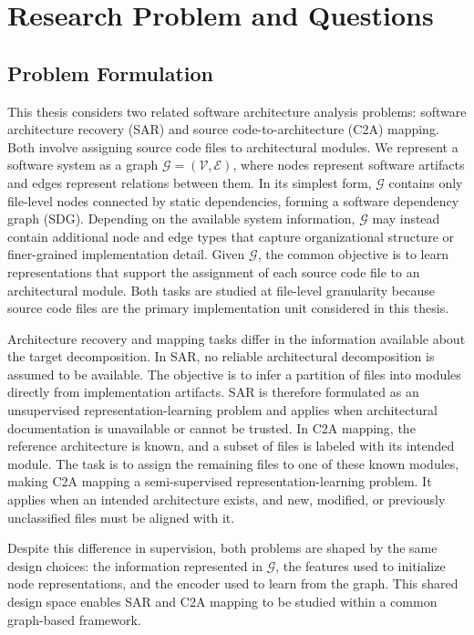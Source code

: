 \chapter{Research Problem and Questions}
\chaptertoc

\section{Problem Formulation}
\label{sec:problem_formulation}
This thesis considers two related software architecture analysis problems: software architecture recovery (SAR) and source code-to-architecture (C2A) mapping. Both involve assigning source code files to architectural modules. We represent a software system as a graph $\mathcal{G} = (\mathcal{V}, \mathcal{E})$, where nodes represent software artifacts and edges represent relations between them. In its simplest form, $\mathcal{G}$ contains only file-level nodes connected by static dependencies, forming a software dependency graph (SDG). Depending on the available system information, $\mathcal{G}$ may instead contain additional node and edge types that capture organizational structure or finer-grained implementation detail. Given $\mathcal{G}$, the common objective is to learn representations that support the assignment of each source code file to an architectural module. Both tasks are studied at file-level granularity because source code files are the primary implementation unit considered in this thesis.

Architecture recovery and mapping tasks differ in the information available about the target decomposition. In SAR, no reliable architectural decomposition is assumed to be available. The objective is to infer a partition of files into modules directly from implementation artifacts. SAR is therefore formulated as an unsupervised representation-learning problem and applies when architectural documentation is unavailable or cannot be trusted. In C2A mapping, the reference architecture is known, and a subset of files is labeled with its intended module. The task is to assign the remaining files to one of these known modules, making C2A mapping a semi-supervised representation-learning problem. It applies when an intended architecture exists, and new, modified, or previously unclassified files must be aligned with it.

Despite this difference in supervision, both problems are shaped by the same design choices: the information represented in $\mathcal{G}$, the features used to initialize node representations, and the encoder used to learn from the graph. This shared design space enables SAR and C2A mapping to be studied within a common graph-based framework.

